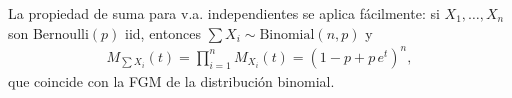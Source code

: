 \begin{observacion}
La propiedad de suma para v.a. independientes se aplica fácilmente: si
$X_1, \dots, X_n$ son Bernoulli$(p)$ iid, entonces
$\sum X_i \sim \text{Binomial}(n,p)$ y
\begin{align}
 M_{\sum X_i}(t) = \prod_{i=1}^n M_{X_i}(t) = (1 - p + p\,e^t)^n,
\end{align}
que coincide con la FGM de la distribución binomial.
\end{observacion}
